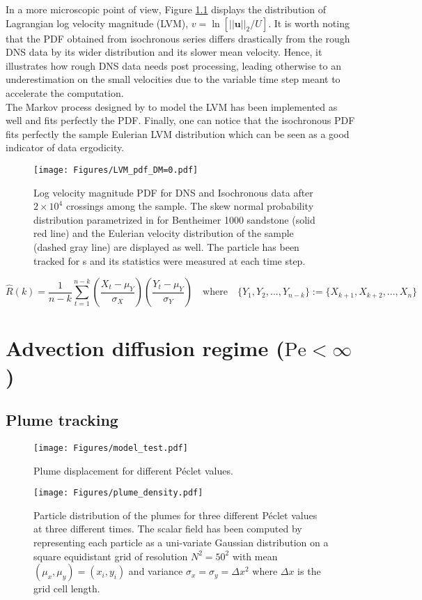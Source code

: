 In a more microscopic point of view, Figure \ref{fig:lvm_pdf_peinf} displays the distribution of Lagrangian log velocity magnitude (LVM), $v = \ln[||\textbf{u}||_2/U]$. 
It is worth noting that the PDF obtained from isochronous series differs drastically from the rough DNS data by its wider distribution and its slower mean velocity.
Hence, it illustrates how rough DNS data needs post processing, leading otherwise to an underestimation on the small velocities due to the variable time step meant to accelerate the computation.\\
The Markov process designed by \cite{Meyer2016} to model the LVM has been implemented as well and fits perfectly the PDF.
Finally, one can notice that the isochronous PDF fits perfectly the sample Eulerian LVM distribution which can be seen as a good indicator of data ergodicity.

\begin{figure}
	\centering
	\texttt{[image: Figures/LVM\_pdf\_DM=0.pdf]}
	\caption{Log velocity magnitude PDF for DNS and Isochronous data after $2\times 10^4$ crossings among the sample. The skew normal probability distribution parametrized in \citet{Meyer2016} for Bentheimer 1000 sandstone (solid red line) and the Eulerian velocity distribution of the sample (dashed gray line) are displayed as well. The particle has been tracked for s and its statistics were measured at each time step.}
	\label{fig:lvm_pdf_peinf}
\end{figure}
$$
\hat R(k) = \frac{1}{n-k} \sum_{t=1}^{n-k} \left(\frac{X_t-\mu_Y}{\sigma_X}\right)\left(\frac{Y_t-\mu_Y}{\sigma_Y}\right) \quad\textrm{where}\quad \{Y_1,Y_2,...,Y_{n-k}\} := \{X_{k+1},X_{k+2},...,X_{n}\} 
$$

\chapter{Advection diffusion regime ($\mathrm{Pe}<\infty$)}

\section{Plume tracking}
\begin{figure}[h!]
	\centering
	\texttt{[image: Figures/model\_test.pdf]}
	\caption{Plume displacement for different Péclet values.}
	\label{fig:lvm_pdf_peinf}
\end{figure}

\begin{figure}[h!]
	\centering
	\texttt{[image: Figures/plume\_density.pdf]}
	\caption{Particle distribution of the plumes for three different Péclet values at three different times. The scalar field has been computed by representing each particle as a uni-variate Gaussian distribution on a square equidistant grid of resolution $N^2=50^2$ with mean $(\mu_x,\mu_y)=(x_i,y_i)$ and variance $\sigma_x = \sigma_y = \Delta x^2$ where $\Delta x$ is the grid cell length.}
	\label{fig:plume_density}
\end{figure}


